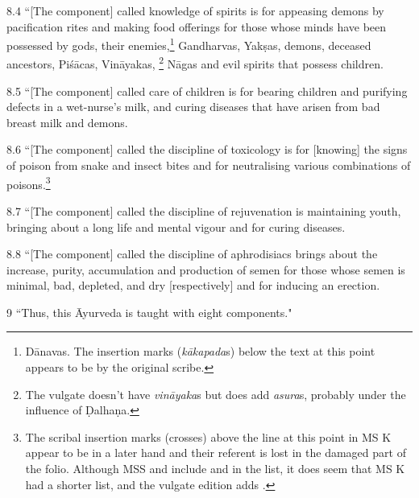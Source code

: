 \begin{translation}
    \item[8.4] “[The component] called knowledge of spirits is for appeasing
    demons by pacification rites and making food offerings for those whose
    minds have been possessed by gods, their enemies,\footnote{Dānavas.  The
    insertion marks (\emph{kākapada}s) below the text at this point appears to
    be by the original scribe.} Gandharvas, Yakṣas, demons, deceased
    ancestors, Piśācas, Vināyakas, \footnote{The vulgate doesn't have
    \emph{vināyaka}s but does add \emph{asura}s, probably under the influence
    of Ḍalhaṇa.} Nāgas and evil spirits
    that possess children. %
    
    
    \item[8.5] “[The component] called care of children is for bearing children 
    and 
    purifying defects in a wet-nurse's milk, and curing diseases that have arisen 
    from bad breast milk and demons.
    
    \item[8.6] “[The component] called the discipline of toxicology is for
    [knowing] the signs of poison from snake and insect bites and for
    neutralising various combinations of poisons.\footnote{The scribal
    insertion marks (crosses) above the line at this point in MS K appear to
    be in a later hand and their referent is lost in the damaged part of the
    folio.  Although MSS  and  include  and
     in the list, it does seem that MS K had
    a shorter list, and the vulgate edition adds .}
    
    \item[8.7] “[The component] called the discipline of rejuvenation is 
    maintaining 
    youth, bringing about a long life and mental vigour and for curing diseases.
    
    
    \item[8.8] “[The component] called the discipline of aphrodisiacs
brings about the increase, purity, accumulation and  production
of semen for those whose semen is minimal, bad, depleted, and dry
[respectively] and for inducing an erection.
    
    \item[9] “Thus, this Āyurveda is taught with eight components."
    

\end{translation}
